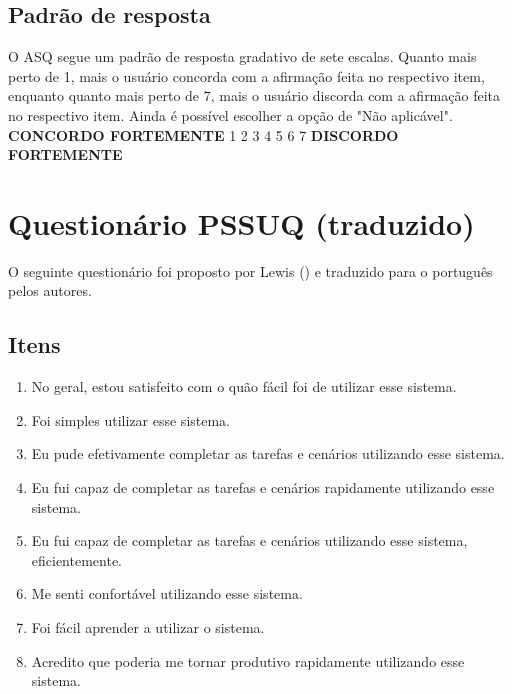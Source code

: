 \begin{anexosenv}
      \section*{Padrão de resposta}
      
	O ASQ segue um padrão de resposta gradativo de sete escalas. Quanto mais perto de 1, mais o usuário concorda com a 
	afirmação feita no respectivo item, enquanto quanto mais perto de 7, mais o usuário discorda com a afirmação feita no
	respectivo item. Ainda é possível escolher a opção de "Não aplicável".\\
            
	\noindent
	\textbf{CONCORDO FORTEMENTE}   1    2    3    4    5    6    7    \textbf{DISCORDO FORTEMENTE}
	
  \chapter{Questionário PSSUQ (traduzido)}
    
    O seguinte questionário foi proposto por Lewis (\citeyear{lewis02}) e traduzido para o português pelos autores.
      
      \section*{Itens}
	
	\begin{enumerate}
	  \item No geral, estou satisfeito com o quão fácil foi de utilizar esse sistema.

	  \item Foi simples utilizar esse sistema.

	  \item Eu pude efetivamente completar as tarefas e cenários utilizando esse sistema.

	  \item Eu fui capaz de completar as tarefas e cenários rapidamente utilizando esse sistema.

	  \item Eu fui capaz de completar as tarefas e cenários utilizando esse sistema, eficientemente.

	  \item Me senti confortável utilizando esse sistema.

	  \item Foi fácil aprender a utilizar o sistema.

	  \item Acredito que poderia me tornar produtivo rapidamente utilizando esse sistema.


\end{enumerate}
\end{anexosenv}
